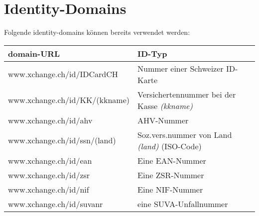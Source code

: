 \documentclass[a4paper]{scrartcl}
\begin{document}
\appendix
\part{Identity-Domains}
Folgende identity-domains können bereits verwendet werden:

\medskip

\begin{tabular}[h]{|l|l|}
\hline
domain-URL & ID-Typ\\
\hline
www.xchange.ch/id/IDCardCH & Nummer einer Schweizer ID-Karte\\
www.xchange.ch/id/KK/(kkname) & Versichertennummer bei der Kasse \textit{(kkname)}\\
www.xchange.ch/id/ahv & AHV-Nummer\\
www.xchange.ch/id/ssn/(land) & Soz.vers.nummer von Land \textit{(land)} (ISO-Code)\\
www.xchange.ch/id/ean & Eine EAN-Nummer\\
www.xchange.ch/id/zsr & Eine ZSR-Nummer\\
www.xchange.ch/id/nif & Eine NIF-Nummer\\
www.xchange.ch/id/suvanr & eine SUVA-Unfallnummer\\
\hline
\end{tabular}
\end{document}
